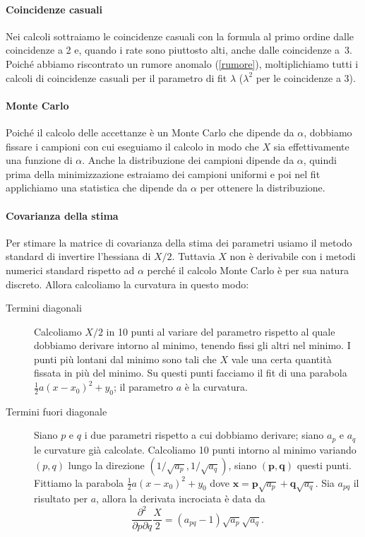 \paragraph{Coincidenze casuali}

Nei calcoli sottraiamo le coincidenze casuali con la formula al primo ordine
dalle coincidenze a 2 e, quando i rate sono piuttosto alti, anche dalle coincidenze a~3.
Poiché abbiamo riscontrato un rumore anomalo (\autoref{rumore}),
moltiplichiamo tutti i calcoli di coincidenze casuali per il parametro di fit $\lambda$
($\lambda^2$ per le coincidenze a 3).

\paragraph{Monte Carlo}

Poiché il calcolo delle accettanze è un Monte Carlo che dipende da $\alpha$,
dobbiamo fissare i campioni con cui eseguiamo il calcolo
in modo che $X$ sia effettivamente una funzione di $\alpha$.
Anche la distribuzione dei campioni dipende da $\alpha$,
quindi prima della minimizzazione estraiamo dei campioni uniformi
e poi nel fit applichiamo una statistica che dipende da $\alpha$ per ottenere la distribuzione.

\paragraph{Covarianza della stima}

Per stimare la matrice di covarianza della stima dei parametri
usiamo il metodo standard di invertire l'hessiana di $X/2$.
Tuttavia $X$ non è derivabile con i metodi numerici standard rispetto ad $\alpha$ perché
il calcolo Monte Carlo è per sua natura discreto.
Allora calcoliamo la curvatura in questo modo:
\begin{description}
	\item[Termini diagonali]
		Calcoliamo $X/2$ in 10 punti al variare del parametro rispetto al quale dobbiamo derivare intorno al minimo,
		tenendo fissi gli altri nel minimo.
		I punti più lontani dal minimo sono tali che $X$ vale una certa quantità fissata in più del minimo.
		Su questi punti facciamo il fit di una parabola $\frac12a(x-x_0)^2+y_0$;
		il parametro $a$ è la curvatura.
	\item[Termini fuori diagonale]
		Siano $p$ e $q$ i due parametri rispetto a cui dobbiamo derivare;
		siano $a_p$ e $a_q$ le curvature già calcolate.
		Calcoliamo 10 punti intorno al minimo variando $(p,q)$ lungo la direzione $(1/\sqrt{a_p},1/\sqrt{a_q})$,
		siano $(\mathbf p,\mathbf q)$ questi punti.
		Fittiamo la parabola $\frac12a(x-x_0)^2+y_0$ dove $\mathbf x=\mathbf p\sqrt{a_p} + \mathbf q\sqrt{a_q}$.
		Sia $a_{pq}$ il risultato per $a$, allora la derivata incrociata è data da
		\begin{equation*}
			\frac{\partial^2}{\partial p\partial q} \frac X2 = (a_{pq} - 1)\sqrt{a_p}\sqrt{a_q}.
		\end{equation*}
\end{description}

